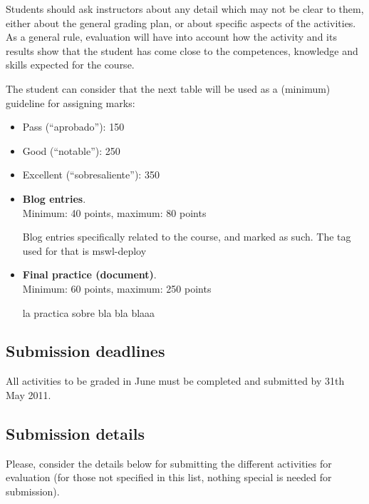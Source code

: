 \documentclass[a4paper]{article}
\begin{document}
Students should ask instructors about any detail which may not be
clear to them, either about the general grading plan, or about
specific aspects of the activities. As a general rule, evaluation will
have into account how the activity and its results show that the
student has come close to the competences, knowledge and skills
expected for the course.

The student can consider that the next table will be used as a
(minimum) guideline for assigning marks:

\begin{itemize}
\item Pass (``aprobado''): 150
\item Good (``notable''): 250
\item Excellent (``sobresaliente''): 350
\end{itemize}

\begin{itemize}
\item \textbf{Blog entries}. \\
  Minimum: 40 points, maximum: 80 points

  Blog entries specifically related to the course, and marked as such. The tag used for that is mswl-deploy


\item \textbf{Final practice (document)}. \\
  Minimum: 60 points, maximum: 250 points

la practica sobre bla bla blaaa

\end{itemize}

\subsection{Submission deadlines}

All activities to be graded in June must be completed and submitted by 31th May 2011.

\subsection{Submission details}

Please, consider the details below for submitting the different activities for evaluation (for those not specified in this list, nothing special is needed for submission).
\end{document}
